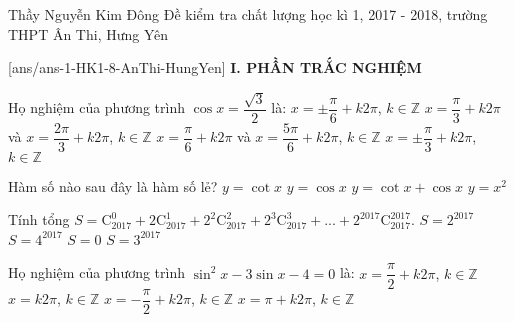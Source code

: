 
	\begin{name}
		{Thầy Nguyễn Kim Đông}
		{Đề kiểm tra chất lượng học kì 1, 2017 - 2018, trường THPT Ân Thi, Hưng Yên}
	\end{name}
	\setcounter{ex}{0}\setcounter{bt}{0}
	[ans/ans-1-HK1-8-AnThi-HungYen]
\noindent\textbf{I. PHẦN TRẮC NGHIỆM}
\begin{ex}%
	Họ nghiệm của phương trình $\cos x=\dfrac{\sqrt{3}}{2}$ là:
	\choice
	{\True $x=\pm \dfrac{\pi}{6}+k2\pi $, $ k \in \mathbb{Z}$}
	{$x=\dfrac{\pi}{3}+k2\pi $ và $x=\dfrac{2\pi}{3}+k2\pi $, $ k \in \mathbb{Z}$}
	{$x=\dfrac{\pi}{6}+k2\pi $ và $x=\dfrac{5\pi}{6}+k2\pi $, $ k \in \mathbb{Z}$}
	{$x=\pm \dfrac{\pi}{3}+k2\pi $, $ k \in \mathbb{Z}$}
\end{ex}
\begin{ex}%
	Hàm số nào sau đây là hàm số lẻ?
	\choice
	{\True $y=\cot x$}
	{$y=\cos x$}
	{$y=\cot x+\cos x$}
	{$y=x^2$}
\end{ex}
\begin{ex}%
Tính tổng $S=\mathrm{C}_{2017}^0+2\mathrm{C}_{2017}^1+2^2\mathrm{C}_{2017}^2+2^3\mathrm{C}_{2017}^3+...+2^{2017}\mathrm{C}_{2017}^{2017}$.
\choice
{$S=2^{2017}$}
{$S=4^{2017}$}
{$S=0$}
{\True $S=3^{2017}$}
\end{ex}
\begin{ex}%
Họ nghiệm của phương trình $\sin^2x-3\sin x-4=0$ là:
\choice
{$x=\dfrac{\pi}{2}+k2\pi $, $ k \in \mathbb{Z}$}
{$x=k2\pi $, $ k \in \mathbb{Z}$}
{\True $x=-\dfrac{\pi}{2}+k2\pi $, $ k \in \mathbb{Z}$}
{$x=\pi+k2\pi $, $ k \in \mathbb{Z}$}
\end{ex}
